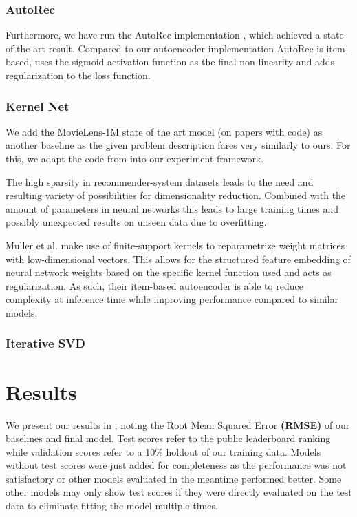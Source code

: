\documentclass[10pt,conference,compsocconf]{IEEEtran}
\begin{document}
    \subsubsection{AutoRec}
    Furthermore, we have run the AutoRec implementation \cite{inproceedings}, which achieved a state-of-the-art result.
    Compared to our autoencoder implementation AutoRec is item-based, uses the sigmoid activation function as the final non-linearity and adds regularization to the loss function.

    \subsubsection{Kernel Net}
    We add the MovieLens-1M state of the art model (on papers with code) as another baseline as the given problem description fares very similarly to ours.
    For this, we adapt the code from \cite{pmlr-v80-muller18a, kernelNetGithub} into our experiment framework.

    The high sparsity in recommender-system datasets leads to the need and resulting variety of possibilities for dimensionality reduction.
    Combined with the amount of parameters in neural networks this leads to large training times and possibly
    unexpected results on unseen data due to overfitting.

    Muller et al. make use of finite-support kernels to reparametrize weight matrices with low-dimensional vectors.
    This allows for the structured feature embedding of neural network weights based on the specific kernel function used and
    acts as regularization.
    As such, their item-based autoencoder is able to reduce complexity at inference time while improving performance compared to similar models.\cite{pmlr-v80-muller18a}

    \subsubsection{Iterative SVD}


    \section{Results}
    We present our results in , noting the Root Mean Squared Error \textbf{(RMSE)} of our baselines and final model.
    Test scores refer to the public leaderboard ranking while validation scores refer to a 10\% holdout of our training data.
    Models without test scores were just added for completeness as the performance was not satisfactory or other models evaluated in the meantime performed better.
    Some other models may only show test scores if they were directly evaluated on the test data to eliminate
    fitting the model multiple times.
\end{document}
